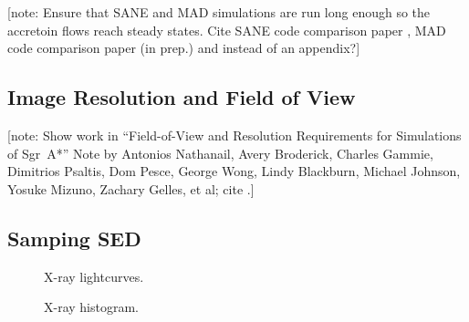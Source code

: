 \documentclass[twocolumn,tighten,dvipsnames,linenumbers]{aastex63}
\newcommand\note[1]{{\color{OliveGreen}[note: #1]}}
\begin{document}
\note{Ensure that SANE and MAD simulations are run long enough so the
  accretoin flows reach steady states.
  Cite SANE code comparison paper \citep{2019ApJS..243...26P}, MAD
  code comparison paper (in prep.) and \citet{2012MNRAS.426.3241N,
    2013MNRAS.436.3856S} instead of an appendix?}

\subsection{Image Resolution and Field of View}
\label{sec:res-FoV}

\note{Show work in ``Field-of-View and Resolution Requirements for
  Simulations of Sgr~A*'' Note by Antonios Nathanail, Avery Broderick,
  Charles Gammie, Dimitrios Psaltis, Dom Pesce, George Wong, Lindy
  Blackburn, Michael Johnson, Yosuke Mizuno, Zachary Gelles, et al;
  cite \citet{2020arXiv200406210P}.}

\subsection{Samping SED}
\label{sec:sed-sample}

\begin{figure}
  \caption{X-ray lightcurves.}
  \label{fig:lc}
\end{figure}

\begin{figure}
  \caption{X-ray histogram.}
  \label{fig:hist}
\end{figure}






\end{document}
